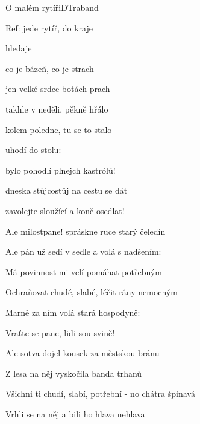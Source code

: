 \setcounter{page}{58}
\begin{song}{O malém rytíři}{D}{Traband}

\begin{SBChorus}

Ref:  jede rytíř,  do kraje

  hledaje

 co je bázeň,  co je strach

 jen velké srdce  botách prach

\end{SBChorus}

\begin{SBVerse}

 takhle v neděli,  pěkně hřálo

 kolem poledne,  tu se to stalo

 uhodí  do stolu:

bylo pohodlí plnejch kastrólů!

 dneska stůjcostůj  na cestu se dát

 zavolejte sloužící a  koně osedlat!

\end{SBVerse}

\begin{SBVerse}

Ale milostpane! spráskne ruce starý čeledín

Ale pán už sedí v sedle a volá s nadšením:

Má povinnost mi velí pomáhat potřebným

Ochraňovat chudé, slabé, léčit rány nemocným

Marně za ním volá stará hospodyně:

Vraťte se pane, lidi sou svině!

\end{SBVerse}

\begin{SBVerse}

Ale sotva dojel kousek za městskou bránu

Z lesa na něj vyskočila banda trhanů

Všichni ti chudí, slabí, potřební - no chátra špinavá

Vrhli se na něj a bili ho hlava nehlava


\end{SBVerse}
\end{song}
